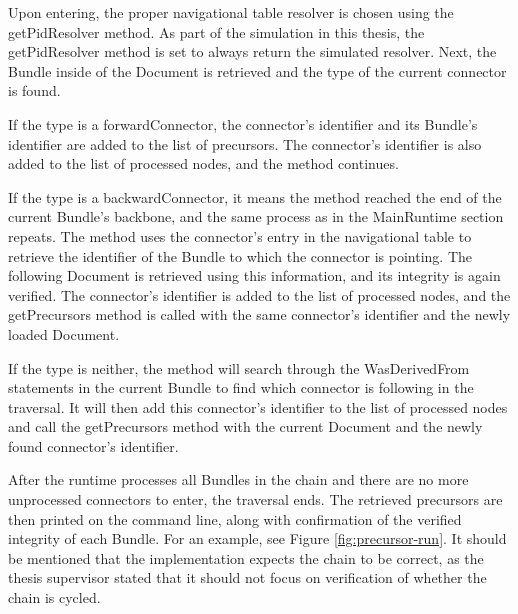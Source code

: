 \documentclass[
  digital,     %
  oneside,     %
  nosansbold,  %
  nocolorbold, %
  lof,         %
  lot,         %
]{fithesis4}
\begin{document}
Upon entering, the proper navigational table resolver is chosen using the getPidResolver method. As part of the simulation in this thesis, the getPidResolver method is set to always return the simulated resolver. Next, the Bundle inside of the Document is retrieved and the type of the current connector is found. 

If the type is a forwardConnector, the connector's identifier and its Bundle's identifier are added to the list of precursors. The connector's identifier is also added to the list of processed nodes, and the method continues. 

If the type is a backwardConnector, it means the method reached the end of the current Bundle's backbone, and the same process as in the MainRuntime section repeats. The method uses the connector's entry in the navigational table to retrieve the identifier of the Bundle to which the connector is pointing. The following Document is retrieved using this information, and its integrity is again verified. The connector's identifier is added to the list of processed nodes, and the getPrecursors method is called with the same connector's identifier and the newly loaded Document. 

If the type is neither, the method will search through the WasDerivedFrom statements in the current Bundle to find which connector is following in the traversal. It will then add this connector's identifier to the list of processed nodes and call the getPrecursors method with the current Document and the newly found connector's identifier. 

After the runtime processes all Bundles in the chain and there are no more unprocessed connectors to enter, the traversal ends. The retrieved precursors are then printed on the command line, along with confirmation of the verified integrity of each Bundle. For an example, see Figure \ref{fig:precursor-run}. It should be mentioned that the implementation expects the chain to be correct, as the thesis supervisor stated that it should not focus on verification of whether the chain is cycled.
\end{document}
